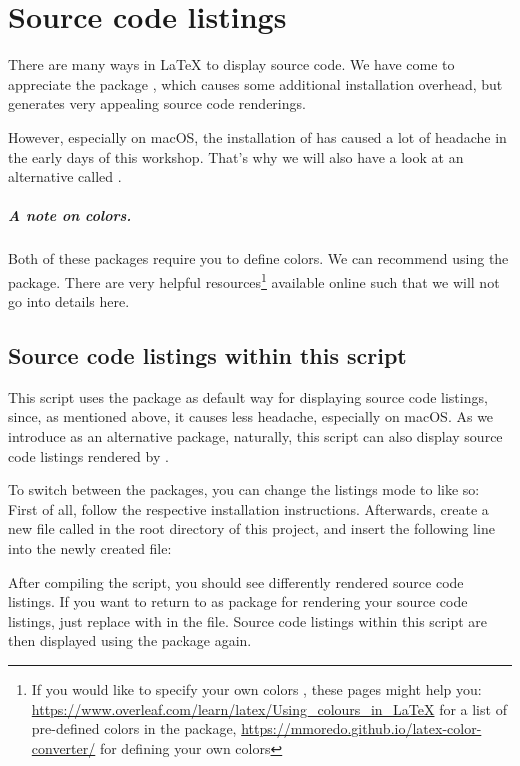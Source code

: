 \chapter{Source code listings}
\label{sec:source-code-listings}

There are many ways in \LaTeX{} to display source code.
We have come to appreciate the package , which causes some additional installation overhead, but generates very appealing source code renderings.

However, especially on macOS, the installation of  has caused a lot of headache in the early days of this workshop.
That's why we will also have a look at an alternative called . 

\paragraph{A note on colors.} Both of these packages require you to define colors. 
We can recommend using the  package.
There are very helpful resources\footnote{If you would like to specify your own colors , these pages might help you: \url{https://www.overleaf.com/learn/latex/Using_colours_in_LaTeX} for a list of pre-defined colors in the  package, \url{https://mmoredo.github.io/latex-color-converter/} for defining your own colors} available online such that we will not go into details here.

\section*{Source code listings within this script}

This script uses the package  as default way for displaying source code listings, since, as mentioned above, it causes less headache, especially on macOS. As we introduce  as an alternative package, naturally, this script can also display source code listings rendered by . 

To switch between the packages, you can change the listings mode to  like so: First of all, follow the respective installation instructions. Afterwards, create a new file called  in the root directory of this project, and insert the following line into the newly created file: 


After compiling the script, you should see differently rendered source code listings. If you want to return to  as package for rendering your source code listings, just replace  with  in the  file. Source code listings within this script are then displayed using the  package again.


